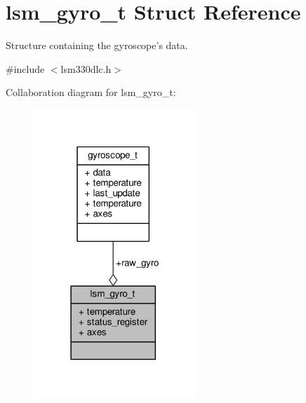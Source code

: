 \hypertarget{structlsm__gyro__t}{\section{lsm\+\_\+gyro\+\_\+t Struct Reference}
\label{structlsm__gyro__t}
}


Structure containing the gyroscope's data.  




{\ttfamily \#include $<$lsm330dlc.\+h$>$}



Collaboration diagram for lsm\+\_\+gyro\+\_\+t\+:
\nopagebreak
\begin{figure}[H]
\begin{center}
\leavevmode
\includegraphics[width=174pt]{structlsm__gyro__t__coll__graph}
\end{center}
\end{figure}

